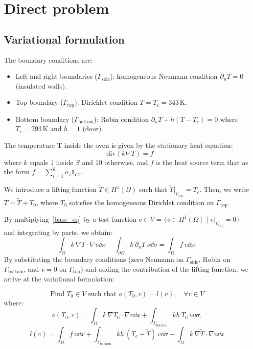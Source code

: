 \section{Direct problem}

\subsection{Variational formulation}

The boundary conditions are:
\begin{itemize}
  \item Left and right boundaries ($\Gamma_{\text{side}}$): homogeneous Neumann condition $\partial_n T = 0$ (insulated walls).
  \item Top boundary ($\Gamma_{\text{top}}$): Dirichlet condition $T = T_c = 343\,\mathrm{K}$.
  \item Bottom boundary ($\Gamma_{\text{bottom}}$): Robin condition $\partial_n T + h(T - T_e) = 0$ where $T_e = 293\, \mathrm{K}$ and $h = 1$ (door).\
\end{itemize}

The temperature T inside the oven is given by the stationary heat equation:
\begin{equation}\label{base_eq}
  -\mathrm{div}(k\nabla T) = f
\end{equation}
where $k$ equals 1 inside $S$ and 10 otherwise, and $f$ is the heat source term that as the form $f = \sum_{i=1}^6 \alpha_i \mathbb{1}_{C_i}$.

We introduce a lifting function $\tilde{T} \in H^1(\Omega)$ such that $\tilde{T}|_{\Gamma_{\text{top}}} = T_c$. Then, we write $T = \tilde{T} + T_0$, where $T_0$ satisfies the homogeneous Dirichlet condition on $\Gamma_{\text{top}}$.

By multiplying~\cref{base_eq} by a test function $v \in V = \{v \in H^1(\Omega) \mid v|_{\Gamma_{\text{top}}} = 0\}$ and integrating by parts, we obtain:
\begin{equation}
\int_\Omega k\,\nabla T \cdot \nabla v \dd x - \int_{\partial\Omega} k\,\partial_n T\, v \dd\sigma = \int_\Omega f\,v \dd x.
\end{equation}
By substituting the boundary conditions (zero Neumann on $\Gamma_{\text{side}}$, Robin on $\Gamma_{\text{bottom}}$, and $v=0$ on $\Gamma_{\text{top}}$) and adding the contribution of the lifting function, we arrive at the variational formulation:

\begin{equation}\label{eq:VF}
  \boxed{
  \text{Find } T_0 \in V \text{ such that } a(T_0,v) = l(v), \quad \forall v \in V
  }
\end{equation}where:
\begin{equation}
a(T_0,v) = \int_\Omega k\,\nabla T_0 \cdot \nabla v \dd x + \int_{\Gamma_{\text{bottom}}} k h\,T_0\,v \dd\sigma,
\end{equation}
\begin{equation}
l(v) = \int_\Omega f\,v \dd x + \int_{\Gamma_{\text{bottom}}} k h\,(T_e - \tilde{T})\,v \dd\sigma - \int_\Omega k\,\nabla \tilde{T} \cdot \nabla v \dd x
\end{equation}

